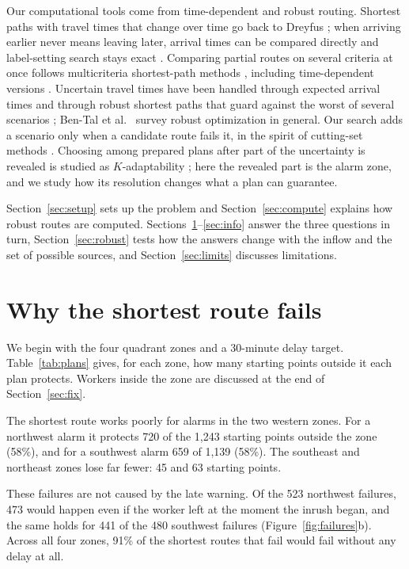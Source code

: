 \documentclass[11pt,a4paper]{article}
\begin{document}
Our computational tools come from time-dependent and robust routing. Shortest paths with travel times that change over time go back to Dreyfus \cite{dreyfus1969}; when arriving earlier never means leaving later, arrival times can be compared directly and label-setting search stays exact \cite{kaufman,orda}. Comparing partial routes on several criteria at once follows multicriteria shortest-path methods \cite{martins1984}, including time-dependent versions \cite{hamacher2006}. Uncertain travel times have been handled through expected arrival times \cite{millerhooks2000} and through robust shortest paths that guard against the worst of several scenarios \cite{yu1998,bertsimas2003}; Ben-Tal et al.\ \cite{bental2009} survey robust optimization in general. Our search adds a scenario only when a candidate route fails it, in the spirit of cutting-set methods \cite{mutapcic2009}. Choosing among prepared plans after part of the uncertainty is revealed is studied as $K$-adaptability \cite{hanasusanto}; here the revealed part is the alarm zone, and we study how its resolution changes what a plan can guarantee.

Section~\ref{sec:setup} sets up the problem and Section~\ref{sec:compute} explains how robust routes are computed. Sections~\ref{sec:why}--\ref{sec:info} answer the three questions in turn, Section~\ref{sec:robust} tests how the answers change with the inflow and the set of possible sources, and Section~\ref{sec:limits} discusses limitations.



\section{Why the shortest route fails}\label{sec:why}
We begin with the four quadrant zones and a 30-minute delay target. Table~\ref{tab:plans} gives, for each zone, how many starting points outside it each plan protects. Workers inside the zone are discussed at the end of Section~\ref{sec:fix}.

The shortest route works poorly for alarms in the two western zones. For a northwest alarm it protects 720 of the 1,243 starting points outside the zone (58\%), and for a southwest alarm 659 of 1,139 (58\%). The southeast and northeast zones lose far fewer: 45 and 63 starting points.

These failures are not caused by the late warning. Of the 523 northwest failures, 473 would happen even if the worker left at the moment the inrush began, and the same holds for 441 of the 480 southwest failures (Figure~\ref{fig:failures}b). Across all four zones, 91\% of the shortest routes that fail would fail without any delay at all.
\end{document}
